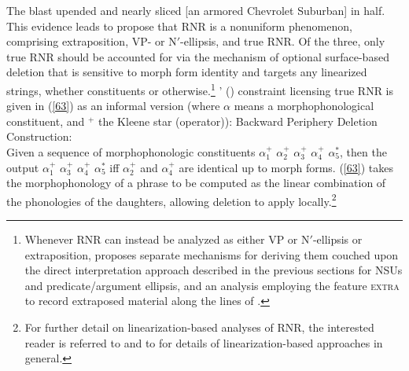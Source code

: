 \ex The blast upended and nearly sliced [an armored Chevrolet Suburban] in half.\label{62}\zl
%
This evidence leads \citet{Chaves2014} to propose that RNR is a nonuniform phenomenon, comprising extraposition,  VP- or N$'$-ellipsis, and true RNR.
%
%
%
Of the three, only true RNR should be accounted for via the mechanism of optional surface-based deletion that is sensitive to morph form identity and targets any linearized strings, whether constituents or otherwise.\footnote{Whenever RNR can instead be analyzed as either VP or N$'$-ellipsis or extraposition, \citet{Chaves2014} proposes separate mechanisms for deriving them couched upon the direct interpretation approach described in the previous sections for NSUs and predicate/argument ellipsis, and an analysis employing the feature \textsc{extra} to record extraposed material along the lines of \citet{KimSag2005, Kay2012}.} \citeauthor{Chaves2014}' (\citeyear[874]{Chaves2014}) constraint licensing true RNR is given in (\ref{63}) as an informal version  (where $\alpha$ means a morphophonological constituent, and $^{+}$ the Kleene star (operator)):
%
%
%
\ea
\label{63}
 Backward Periphery Deletion Construction:\\

Given a sequence of morphophonologic constituents $\alpha_{1}^{+}$ $\alpha_{2}^{+}$ $\alpha_{3}^{+}$ $\alpha_{4}^{+}$ $\alpha_{5}^{*}$, then the output
$\alpha_{1}^{+}$ $\alpha_{3}^{+}$ $\alpha_{4}^{+}$ $\alpha_{5}^{*}$
iff $\alpha_{2}^{+}$ and $\alpha_{4}^{+}$ are identical up to morph forms.
\z
(\ref{63}) takes the morphophonology of a phrase to be computed as the linear combination of the phonologies of the daughters, allowing deletion to apply locally.\footnote{For further detail on linearization-based analyses of RNR, the interested reader is referred to \citet{Yatabe2001, Yatabe2012} and to  for details of linearization-based approaches in general.}



